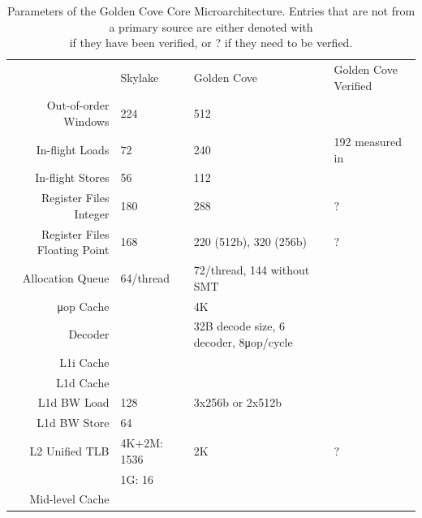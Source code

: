 \begin{table}
	\centering
	\caption{\label{tab:micro-arch-params}Parameters of the Golden Cove Core Microarchitecture. Entries that are not from a primary source are either denoted with\\\checkmark if they have been verified, or ? if they need to be verfied.}
	\begin{tabular}{r|lll}
		\toprule
			&	Skylake & Golden Cove & Golden Cove Verified \\
		\rowcolor[HTML]{EFEFEF}Out-of-order Windows		& 224~\cite{Intel_2020_Skylake_SP} & 512~\cite{Intel_2021_Architecture_Day,ServerTheHome_2023_SPR_Press,Wccftech_2023_SPR_Press} & \checkmark~\figref{robsize-reorder} \\
		In-flight Loads & 72~\cite{Intel_2020_Skylake_SP} & 240~\cite{ServerTheHome_2023_SPR_Press,Wccftech_2023_SPR_Press} & 192 measured in~\figref{robsize-load} \\
		\rowcolor[HTML]{EFEFEF}In-flight Stores & 56~\cite{Intel_2020_Skylake_SP} & 112~\cite{ServerTheHome_2023_SPR_Press,Wccftech_2023_SPR_Press} & \checkmark~\figref{robsize-store} \\
		Register Files Integer & 180~\cite{Intel_2020_Skylake_SP} & 288~\cite{ServerTheHome_2023_SPR_Press,Wccftech_2023_SPR_Press} & ? \\
		\rowcolor[HTML]{EFEFEF}Register Files Floating Point & 168~\cite{Intel_2020_Skylake_SP} & 220 (512b), 320 (256b)~\cite{ServerTheHome_2023_SPR_Press,Wccftech_2023_SPR_Press} & ? \\
		Allocation Queue & 64/thread~\cite{Intel_2020_Skylake_SP} & 72/thread, 144 without SMT~\cite{Intel_2021_Architecture_Day,ServerTheHome_2023_SPR_Press,Wccftech_2023_SPR_Press} & \\
		μop Cache & & 4K~\cite{Intel_2021_Architecture_Day} & \\
		Decoder & & 32B decode size, 6 decoder, 8μop/cycle~\cite{Intel_2021_Architecture_Day} \\
		\rowcolor[HTML]{EFEFEF}L1i Cache & & & \\
		L1d Cache & & \\
		\rowcolor[HTML]{EFEFEF}L1d BW Load & 128~\cite{Intel_2020_Skylake_SP} & 3x256b or 2x512b~\cite{Intel_2021_Architecture_Day} & \\
		L1d BW Store & 64~\cite{Intel_2020_Skylake_SP} & & \\
		\rowcolor[HTML]{EFEFEF}L2 Unified TLB & 4K+2M: 1536 & 2K~\cite{ServerTheHome_2023_SPR_Press,Wccftech_2023_SPR_Press} & ? \\
		\rowcolor[HTML]{EFEFEF}  & 1G: 16~\cite{Intel_2020_Skylake_SP} & & \\
		Mid-level Cache & & & \\
		\bottomrule
	\end{tabular}
\end{table}


